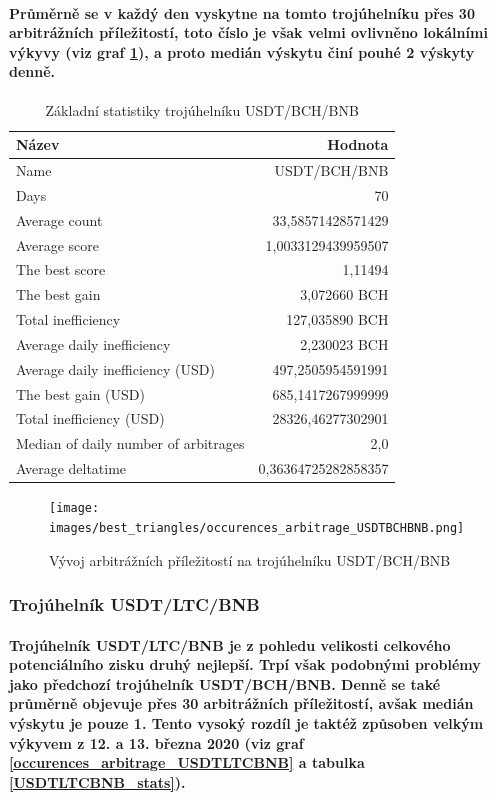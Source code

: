 \documentclass[thesis=B,czech]{FITthesis}[2019/03/21]
\begin{document}
\paragraph{
Průměrně se v každý den vyskytne na tomto trojúhelníku přes 30 arbitrážních příležitostí, toto číslo je však velmi ovlivněno lokálními výkyvy (viz graf \ref{occurences_arbitrage_USDTBCHBNB}), a proto medián výskytu činí pouhé 2 výskyty denně.
}
\begin{table}\centering
\caption{Základní statistiky trojúhelníku USDT/BCH/BNB}
\label{USDTBCHBNB_stats}
\begin{tabular}{|| l | r ||}
\hline Název & Hodnota \\ 
\hline\hline Name & USDT/BCH/BNB \\ 
\hline Days & 70 \\ 
\hline Average count & 33,58571428571429 \\ 
\hline Average score & 1,0033129439959507 \\ 
\hline The best score & 1,11494 \\ 
\hline The best gain & 3,072660 BCH \\ 
\hline Total inefficiency & 127,035890 BCH \\ 
\hline Average daily inefficiency & 2,230023 BCH \\ 
\hline Average daily inefficiency (USD) & 497,2505954591991 \\ 
\hline The best gain (USD) & 685,1417267999999 \\ 
\hline Total inefficiency (USD) & 28326,46277302901 \\ 
\hline Median of daily number of arbitrages & 2,0 \\ 
\hline Average deltatime & 0,36364725282858357 \\ 
\hline
\end{tabular}
\end{table}

\begin{figure}\centering
	\texttt{[image: images/best\_triangles/occurences\_arbitrage\_USDTBCHBNB.png]}
	\caption{Vývoj arbitrážních příležitostí na trojúhelníku USDT/BCH/BNB }\label{occurences_arbitrage_USDTBCHBNB}
\end{figure}

\subsubsection{Trojúhelník USDT/LTC/BNB}
\paragraph{
Trojúhelník USDT/LTC/BNB je z pohledu velikosti celkového potenciálního zisku druhý nejlepší. Trpí však podobnými problémy jako předchozí trojúhelník USDT/BCH/BNB. Denně se také průměrně objevuje přes 30 arbitrážních příležitostí, avšak medián výskytu je pouze 1. Tento vysoký rozdíl je taktéž způsoben velkým výkyvem z 12. a 13. března 2020 (viz graf \ref{occurences_arbitrage_USDTLTCBNB} a tabulka \ref{USDTLTCBNB_stats}).
}
\end{document}
